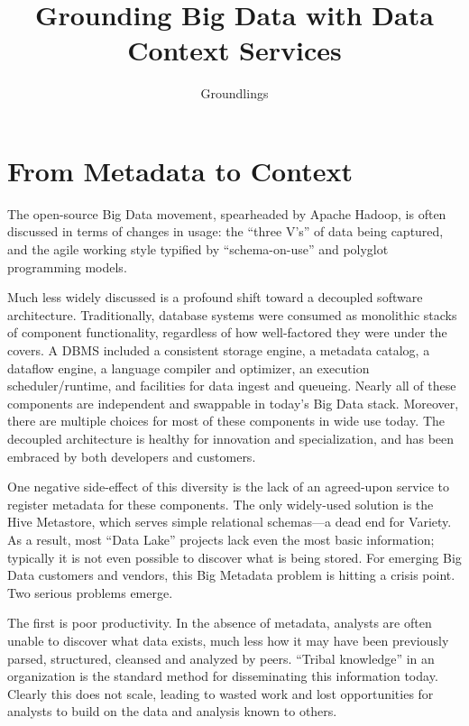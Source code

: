 \documentclass{sig-alternate}
\begin{document}
\newcommand{\smallitem}[1]{\vspace{1em}\noindent\textbf{#1}}
\newcommand{\smallitembot}{\vspace{1em}\noindent}



\title{Grounding Big Data with Data Context Services}
\author{
Groundlings
}

\maketitle

\section{From Metadata to Context}
The open-source Big Data movement, spearheaded by Apache Hadoop, is often discussed in terms of changes in usage: the ``three V's'' of data being captured, and the agile working style typified by ``schema-on-use'' and polyglot programming models.

Much less widely discussed is a profound shift toward a decoupled software architecture. Traditionally, database systems were consumed as monolithic stacks of component functionality, regardless of how well-factored they were under the covers. A DBMS included a consistent storage engine, a metadata catalog, a dataflow engine, a language compiler and optimizer, an execution scheduler/runtime, and facilities for data ingest and queueing.  Nearly all of these components are independent and swappable in today's Big Data stack. Moreover, there are multiple choices for most of these components in wide use today. The decoupled architecture is healthy for innovation and specialization, and has been embraced by both developers and customers.

One negative side-effect of this diversity is the lack of an agreed-upon service to register metadata for these components. The only widely-used solution is the Hive Metastore, which serves simple relational schemas---a dead end for Variety. As a result, most ``Data Lake'' projects lack even the most basic information; typically it is not even possible to discover what is being stored. 
For emerging Big Data customers and vendors, this Big Metadata problem is hitting a crisis point.  Two serious problems emerge.

The first is poor productivity.
In the absence of metadata, analysts are often unable to discover what data exists, much less how it may have been previously parsed, structured, cleansed and analyzed by peers. ``Tribal knowledge'' in an organization is the standard method for disseminating this information today. Clearly this does not scale, leading to wasted work and lost opportunities for analysts to build on the data and analysis known to others.
\end{document}
